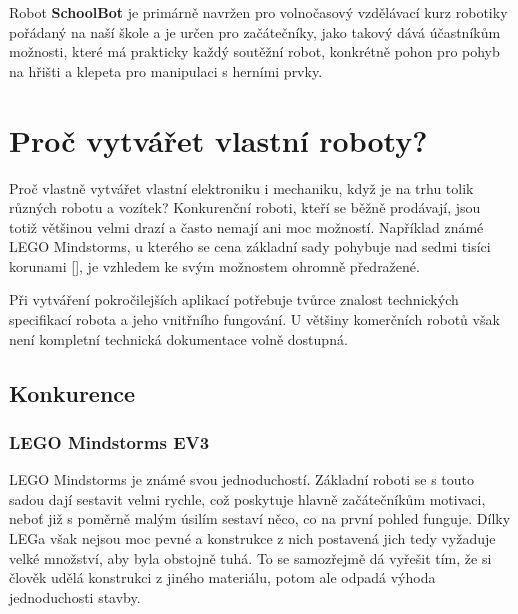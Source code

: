 \documentclass{template/socthesis}
\begin{document}
Robot \textbf{SchoolBot} je primárně navržen pro volnočasový vzdělávací kurz robotiky pořádaný na naší škole a je určen pro začátečníky, jako takový dává účastníkům možnosti, které má prakticky každý soutěžní robot, konkrétně pohon pro pohyb na hřišti a klepeta pro manipulaci s herními prvky.



\newpage

\chapter{Proč vytvářet vlastní roboty?}

Proč vlastně vytvářet vlastní elektroniku i mechaniku, když je na trhu tolik různých robotu a vozítek? Konkurenční roboti, kteří se běžně prodávají, jsou totiž většinou velmi drazí a často nemají ani moc možností. Například známé LEGO Mindstorms, u kterého se cena základní sady pohybuje nad sedmi tisíci korunami [], %
 je vzhledem ke svým možnostem ohromně předražené.
 
Při vytváření pokročilejších aplikací potřebuje tvůrce znalost technických specifikací robota a jeho vnitřního fungování. U většiny komerčních robotů však není kompletní technická dokumentace volně dostupná.


\section{Konkurence}

\subsection{LEGO Mindstorms EV3}

LEGO Mindstorms je známé svou jednoduchostí. Základní roboti se s touto sadou dají sestavit velmi rychle, což poskytuje hlavně začátečníkům motivaci, neboť již s poměrně malým úsilím sestaví něco, co na první pohled funguje. Dílky LEGa však nejsou moc pevné a konstrukce z nich postavená jich tedy vyžaduje velké množství, aby byla obstojně tuhá. To se samozřejmě dá vyřešit tím, že si člověk udělá konstrukci z jiného materiálu, potom ale odpadá výhoda jednoduchosti stavby.
\end{document}
